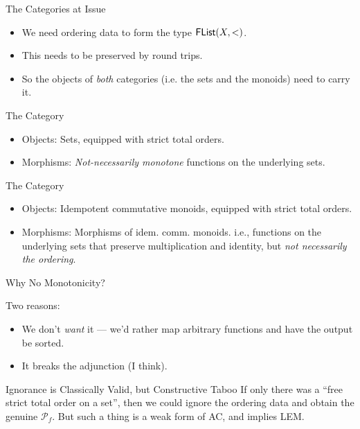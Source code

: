 \documentclass{beamer}
\begin{document}
\begin{frame}{The Categories at Issue}
\begin{itemize}
  \item We need ordering data to form the type $\AgdaDatatype{FList}(X,<)$.
  \item This needs to be preserved by round trips.
  \item So the objects of \emph{both} categories (i.e. the sets and the monoids) need to carry it.
\end{itemize}
\pause

\begin{block}{The Category }
\begin{itemize}
  \item Objects: Sets, equipped with strict total orders.
  \item Morphisms: \emph{Not-necessarily monotone} functions on the underlying sets.
\end{itemize}
\end{block}

\begin{block}{The Category }
\begin{itemize}
  \item Objects: Idempotent commutative monoids, equipped with strict total orders.
  \item Morphisms: Morphisms of idem. comm. monoids. i.e., functions on the underlying sets that preserve multiplication and identity, but \emph{not necessarily the ordering}.
\end{itemize}
\end{block}
\end{frame}

\begin{frame}{Why No Monotonicity?}

Two reasons:
\begin{itemize}
\item We don't \emph{want} it --- we'd rather map arbitrary functions and have the output be sorted.
\item It breaks the adjunction (I think).
\end{itemize}

\pause

\begin{block}{Ignorance is Classically Valid, but Constructive Taboo}
 If only there was a ``free strict total order on a set'', then we could ignore the ordering data and obtain the genuine $\mathcal{P}_{f}$.
 But such a thing is a weak form of AC, and implies LEM.
\end{block}
\end{frame}
\end{document}
